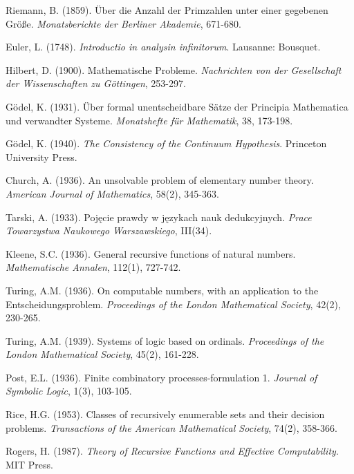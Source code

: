 \documentclass[12pt]{article}
\theoremstyle{plain}
\theoremstyle{definition}
\begin{document}
\begin{thebibliography}{99}

 Riemann, B. (1859). Über die Anzahl der Primzahlen unter einer gegebenen Größe. \emph{Monatsberichte der Berliner Akademie}, 671-680.

 Euler, L. (1748). \emph{Introductio in analysin infinitorum}. Lausanne: Bousquet.

 Hilbert, D. (1900). Mathematische Probleme. \emph{Nachrichten von der Gesellschaft der Wissenschaften zu Göttingen}, 253-297.

 Gödel, K. (1931). Über formal unentscheidbare Sätze der Principia Mathematica und verwandter Systeme. \emph{Monatshefte für Mathematik}, 38, 173-198.

 Gödel, K. (1940). \emph{The Consistency of the Continuum Hypothesis}. Princeton University Press.

 Church, A. (1936). An unsolvable problem of elementary number theory. \emph{American Journal of Mathematics}, 58(2), 345-363.

 Tarski, A. (1933). Pojęcie prawdy w językach nauk dedukcyjnych. \emph{Prace Towarzystwa Naukowego Warszawskiego}, III(34).

 Kleene, S.C. (1936). General recursive functions of natural numbers. \emph{Mathematische Annalen}, 112(1), 727-742.

 Turing, A.M. (1936). On computable numbers, with an application to the Entscheidungsproblem. \emph{Proceedings of the London Mathematical Society}, 42(2), 230-265.

 Turing, A.M. (1939). Systems of logic based on ordinals. \emph{Proceedings of the London Mathematical Society}, 45(2), 161-228.

 Post, E.L. (1936). Finite combinatory processes-formulation 1. \emph{Journal of Symbolic Logic}, 1(3), 103-105.

 Rice, H.G. (1953). Classes of recursively enumerable sets and their decision problems. \emph{Transactions of the American Mathematical Society}, 74(2), 358-366.

 Rogers, H. (1987). \emph{Theory of Recursive Functions and Effective Computability}. MIT Press.


\end{thebibliography}
\end{document}
